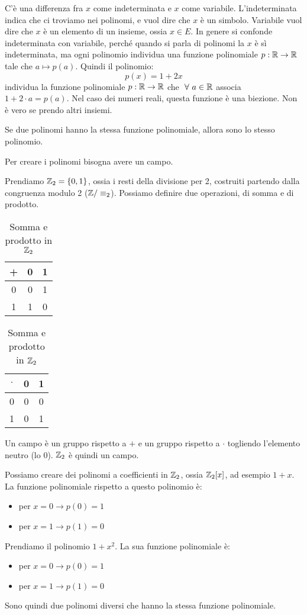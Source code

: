 C'\`e una differenza fra $x$ come indeterminata e $x$ come variabile. L'indeterminata indica che ci troviamo nei polinomi, e vuol dire che $x$ \`e un simbolo. Variabile vuol dire che $x$ \`e un elemento di un insieme, ossia $x \in E$. In genere si confonde indeterminata con variabile, perch\'e quando si parla di polinomi la $x$ \`e s\`i indeterminata, ma ogni polinomio individua una funzione polinomiale $p : \mathbb{R} \to \mathbb{R}$ tale che $ a \mapsto p(a)$. Quindi il polinomio:
\[
p(x) = 1 + 2x
\]
individua la funzione polinomiale $p : \mathbb{R} \to \mathbb{R}$ che $ \forall a \in \reals$ associa $1 + 2 \cdot a = p(a)$. Nel caso dei numeri reali, questa funzione \`e una biezione. Non \`e vero se prendo altri insiemi.

\begin{defn}
Se due polinomi hanno la stessa funzione polinomiale, allora sono lo stesso polinomio. 
\end{defn}

Per creare i polinomi bisogna avere un campo.

Prendiamo $\mathbb{Z}_2 = \{ 0, 1 \}$, ossia i resti della divisione per 2, costruiti partendo dalla congruenza modulo 2 ($\mathbb{Z} / \equiv_2$). Possiamo definire due operazioni, di somma e di prodotto.

\begin{table}[ht]
\centering
\begin{tabular}{c|cc}
+ & 0 & 1 \\
\hline
0 & 0 & 1 \\
1 & 1 & 0
\end{tabular}
\quad
\begin{tabular}{c|cc}
$\cdot$ & 0 & 1 \\
\hline
0 & 0 & 0 \\
1 & 0 & 1
\end{tabular}
\caption{Somma e prodotto in $\mathbb{Z}_2$}
\end{table}

Un campo \`e un gruppo rispetto a $+$ e un gruppo rispetto a $\cdot$ togliendo l'elemento neutro (lo 0). $\mathbb{Z}_2$ \`e quindi un campo.

Possiamo creare dei polinomi a coefficienti in $\mathbb{Z}_2$, ossia $\mathbb{Z}_2[x]$, ad esempio $1 + x$. La funzione polinomiale rispetto a questo polinomio \`e:
\begin{itemize}
    \item per $x = 0 \to p(0) = 1$
    \item per $x = 1 \to p(1) = 0$
\end{itemize}
Prendiamo il polinomio $1 + x^2$. La sua funzione polinomiale \`e:
\begin{itemize}
    \item per $x = 0 \to p(0) = 1$
    \item per $x = 1 \to p(1) = 0$
\end{itemize}
Sono quindi due polinomi diversi che hanno la stessa funzione polinomiale.

